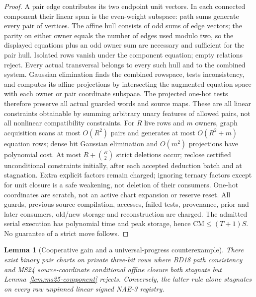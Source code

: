 \documentclass[11pt]{article}
\newtheorem{lemma}[theorem]{Lemma}
\begin{document}
\begin{proof}
A pair edge contributes its two endpoint unit vectors. In each connected component their linear span is the even-weight subspace: path sums generate every pair of vertices. The affine hull consists of odd sums of edge vectors; the parity on either owner equals the number of edges used modulo two, so the displayed equations plus an odd owner sum are necessary and sufficient for the pair hull. Isolated rows vanish under the component equation; empty relations reject. Every actual transversal belongs to every such hull and to the combined system. Gaussian elimination finds the combined rowspace, tests inconsistency, and computes its affine projections by intersecting the augmented equation space with each owner or pair coordinate subspace. The projected one-hot tests therefore preserve all actual guarded words and source maps. These are all linear constraints obtainable by summing arbitrary unary features of allowed pairs, not all nonlinear compatibility constraints.
For $R$ live rows and $m$ owners, graph acquisition scans at most $O(R^2)$ pairs and generates at most $O(R^2+m)$ equation rows; dense bit Gaussian elimination and $O(m^2)$ projections have polynomial cost. At most $R+\binom R2$ strict deletions occur; reclose certified unconditional constraints initially, after each accepted deduction batch and at stagnation. Extra explicit factors remain charged; ignoring ternary factors except for unit closure is a safe weakening, not deletion of their consumers. One-hot coordinates are scratch, not an active chart expansion or reserve reset. All guards, previous source compilation, accesses, failed tests, provenance, prior and later consumers, old/new storage and reconstruction are charged. The admitted serial execution has polynomial time and peak storage, hence $\mathrm{CM}\le(T+1)S$. No guarantee of a strict move follows.
\end{proof}
\begin{lemma}[Cooperative gain and a universal-progress counterexample]\label{lem:ms25-stall}
There exist binary pair charts on private three-bit rows where BD18 path consistency and MS24 source-coordinate conditional affine closure both stagnate but Lemma~\ref{lem:ms25-component} rejects. Conversely, the latter rule alone stagnates on every raw unpinned linear signed NAE-3 registry.
\end{lemma}
\end{document}

